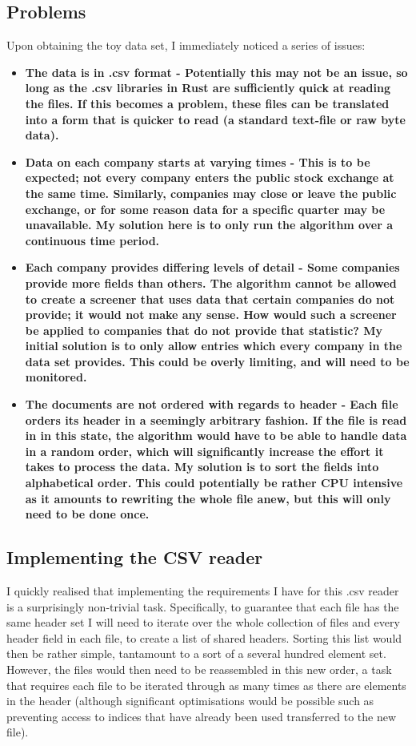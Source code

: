 \subsection{Problems}
Upon obtaining the toy data set, I immediately noticed a series of issues:
\begin{itemize}
    \item \bf The data is in .csv format \rm - Potentially this may not be an issue, so long as the .csv libraries in Rust are sufficiently quick at reading the files. If this becomes a problem, these files can be translated into a form that is quicker to read (a standard text-file or raw byte data).
    \item \bf Data on each company starts at varying times \rm - This is to be expected; not every company enters the public stock exchange at the same time. Similarly, companies may close or leave the public exchange, or for some reason data for a specific quarter may be unavailable. My solution here is to only run the algorithm over a continuous time period.
    \item \bf Each company provides differing levels of detail \rm - Some companies provide more fields than others. The algorithm cannot be allowed to create a screener that uses data that certain companies do not provide; it would not make any sense. How would such a screener be applied to companies that do not provide that statistic? My initial solution is to only allow entries which every company in the data set provides. This could be overly limiting, and will need to be monitored.
    \item \bf The documents are not ordered with regards to header \rm - Each file orders its header in a seemingly arbitrary fashion. If the file is read in in this state, the algorithm would have to be able to handle data in a random order, which will significantly increase the effort it takes to process the data. My solution is to sort the fields into alphabetical order. This could potentially be rather CPU intensive as it amounts to rewriting the whole file anew, but this will only need to be done once.
\end{itemize}

\subsection{Implementing the CSV reader} \label{DataCSVRead}
I quickly realised that implementing the requirements I have for this .csv reader is a surprisingly non-trivial task. Specifically, to guarantee that each file has the same header set I will need to iterate over the whole collection of files and every header field in each file, to create a list of shared headers. Sorting this list would then be rather simple, tantamount to a sort of a several hundred element set. However, the files would then need to be reassembled in this new order, a task that requires each file to be iterated through as many times as there are elements in the header (although significant optimisations would be possible such as preventing access to indices that have already been used transferred to the new file). \newline

